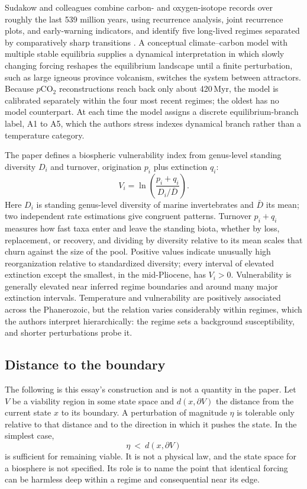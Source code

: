\documentclass[11pt]{article}
\theoremstyle{definition}
\begin{document}
Sudakow and colleagues combine carbon- and oxygen-isotope records over roughly the last 539 million years, using recurrence analysis, joint recurrence plots, and early-warning indicators, and identify five long-lived regimes separated by comparatively sharp transitions \cite{sudakow}. A conceptual climate--carbon model with multiple stable equilibria supplies a dynamical interpretation in which slowly changing forcing reshapes the equilibrium landscape until a finite perturbation, such as large igneous province volcanism, switches the system between attractors. Because $p\mathrm{CO_2}$ reconstructions reach back only about 420\,Myr, the model is calibrated separately within the four most recent regimes; the oldest has no model counterpart. At each time the model assigns a discrete equilibrium-branch label, A1 to A5, which the authors stress indexes dynamical branch rather than a temperature category.

The paper defines a biospheric vulnerability index from genus-level standing diversity $D_i$ and turnover, origination $p_i$ plus extinction $q_i$:
\begin{equation}
V_i=\ln\!\left(\frac{p_i+q_i}{D_i/\bar D}\right).
\end{equation}
Here $D_i$ is standing genus-level diversity of marine invertebrates and $\bar D$ its mean; two independent rate estimations give congruent patterns. Turnover $p_i+q_i$ measures how fast taxa enter and leave the standing biota, whether by loss, replacement, or recovery, and dividing by diversity relative to its mean scales that churn against the size of the pool. Positive values indicate unusually high reorganization relative to standardized diversity; every interval of elevated extinction except the smallest, in the mid-Pliocene, has $V_i>0$. Vulnerability is generally elevated near inferred regime boundaries and around many major extinction intervals. Temperature and vulnerability are positively associated across the Phanerozoic, but the relation varies considerably within regimes, which the authors interpret hierarchically: the regime sets a background susceptibility, and shorter perturbations probe it.

\subsection{Distance to the boundary}

The following is this essay's construction and is not a quantity in the paper. Let $V$ be a viability region in some state space and $d(x,\partial V)$ the distance from the current state $x$ to its boundary. A perturbation of magnitude $\eta$ is tolerable only relative to that distance and to the direction in which it pushes the state. In the simplest case,
\begin{equation}
\eta\ <\ d(x,\partial V)
\end{equation}
is sufficient for remaining viable. It is not a physical law, and the state space for a biosphere is not specified. Its role is to name the point that identical forcing can be harmless deep within a regime and consequential near its edge.
\end{document}
